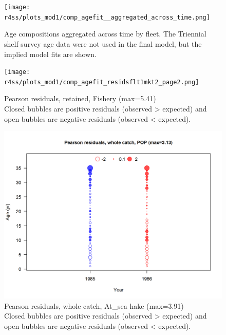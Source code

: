 \documentclass[12pt,]{article}
\begin{document}
\FloatBarrier

\begin{figure}
\centering
\texttt{[image: r4ss/plots\_mod1/comp\_agefit\_\_aggregated\_across\_time.png]}
\caption{Age compositions aggregated across time by fleet. The Triennial
shelf survey age data were not used in the final model, but the implied
model fits are shown. \label{fig:age_agg}}
\end{figure}

\begin{figure}
\centering
\texttt{[image: r4ss/plots\_mod1/comp\_agefit\_residsflt1mkt2\_page2.png]}
\caption{Pearson residuals, retained, Fishery (max=5.41)\\
Closed bubbles are positive residuals (observed \textgreater{} expected)
and open bubbles are negative residuals (observed \textless{} expected).
\label{fig:fishery_age_pearson}}
\end{figure}

\begin{figure}
\centering
\includegraphics{r4ss/plots_mod1/comp_agefit_residsflt2mkt0.png}
\caption{Pearson residuals, whole catch, At\_sea hake (max=3.91)\\
Closed bubbles are positive residuals (observed \textgreater{} expected)
and open bubbles are negative residuals (observed \textless{} expected).
\label{fig:ashop_age_pearson}}
\end{figure}
\end{document}
